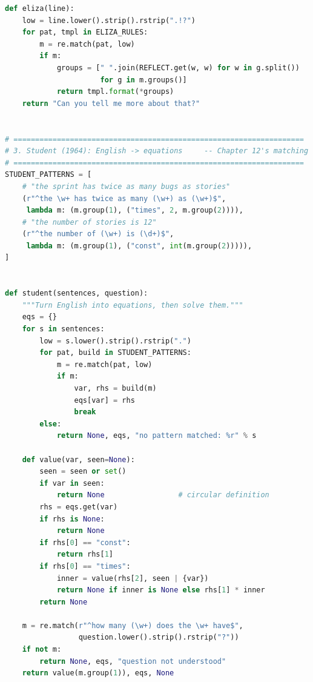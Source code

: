 \begin{lab}
\begin{lstlisting}[language=Python]
def eliza(line):
    low = line.lower().strip().rstrip(".!?")
    for pat, tmpl in ELIZA_RULES:
        m = re.match(pat, low)
        if m:
            groups = [" ".join(REFLECT.get(w, w) for w in g.split())
                      for g in m.groups()]
            return tmpl.format(*groups)
    return "Can you tell me more about that?"


# ===================================================================
# 3. Student (1964): English -> equations     -- Chapter 12's matching
# ===================================================================
STUDENT_PATTERNS = [
    # "the sprint has twice as many bugs as stories"
    (r"^the \w+ has twice as many (\w+) as (\w+)$",
     lambda m: (m.group(1), ("times", 2, m.group(2)))),
    # "the number of stories is 12"
    (r"^the number of (\w+) is (\d+)$",
     lambda m: (m.group(1), ("const", int(m.group(2))))),
]


def student(sentences, question):
    """Turn English into equations, then solve them."""
    eqs = {}
    for s in sentences:
        low = s.lower().strip().rstrip(".")
        for pat, build in STUDENT_PATTERNS:
            m = re.match(pat, low)
            if m:
                var, rhs = build(m)
                eqs[var] = rhs
                break
        else:
            return None, eqs, "no pattern matched: %r" % s

    def value(var, seen=None):
        seen = seen or set()
        if var in seen:
            return None                 # circular definition
        rhs = eqs.get(var)
        if rhs is None:
            return None
        if rhs[0] == "const":
            return rhs[1]
        if rhs[0] == "times":
            inner = value(rhs[2], seen | {var})
            return None if inner is None else rhs[1] * inner
        return None

    m = re.match(r"^how many (\w+) does the \w+ have$",
                 question.lower().strip().rstrip("?"))
    if not m:
        return None, eqs, "question not understood"
    return value(m.group(1)), eqs, None



\end{lstlisting}
\end{lab}
